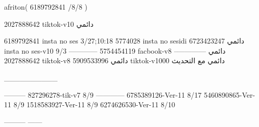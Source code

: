 afriton(
6189792841 /8/8
)

2027888642 tiktok-v10
دائمي

6189792841 insta no ses
3/27;10:18
5774028 insta no sesidi
دائمي
6723423247 insta no ses-v10
9/3
------------
5754454119 facbook-v8
دائمي
--------------
2027888642 tiktok-v8
دائمي
5909533996 tiktok-v1000
دائمي مع التحديث

__________

---------
827296278-tik-v7
8/9
------------
6785389126-Ver-11
8/17
5460890865-Ver-11
8/9
1518583927-Ver-11
8/9
6274626530-Ver-11
8/10

---------
------
